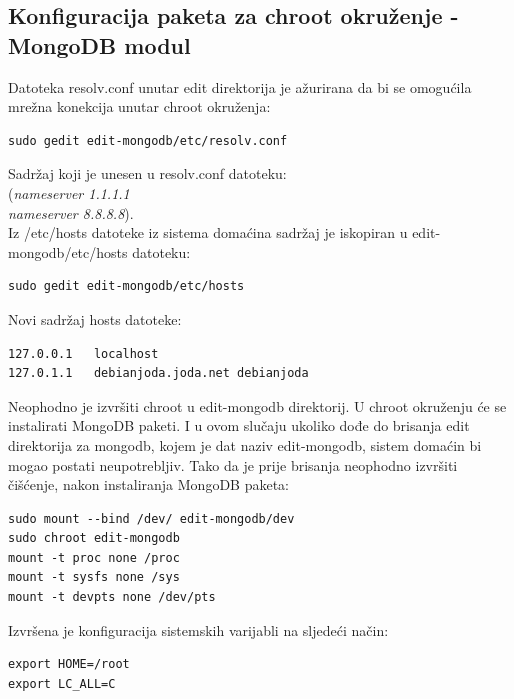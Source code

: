 \documentclass[12pt,vi]{mitthesis}
\begin{document}
\subsection*{Konfiguracija paketa za chroot okruženje - MongoDB modul}
\noindent
Datoteka resolv.conf unutar edit direktorija je ažurirana da bi se omogućila mrežna konekcija unutar chroot okruženja:
\begin{lstlisting}[style=BashInputStyle]
sudo gedit edit-mongodb/etc/resolv.conf
\end{lstlisting}
Sadržaj koji je unesen u resolv.conf datoteku:\\
(\textit{nameserver 1.1.1.1 \\
nameserver 8.8.8.8}).\\
\noindent
Iz /etc/hosts datoteke iz sistema domaćina sadržaj je iskopiran u edit-mongodb/etc/hosts datoteku:
\begin{lstlisting}[style=BashInputStyle]
sudo gedit edit-mongodb/etc/hosts
\end{lstlisting}
Novi sadržaj hosts datoteke:
\begin{lstlisting}
127.0.0.1	localhost
127.0.1.1	debianjoda.joda.net	debianjoda
\end{lstlisting}
\noindent
Neophodno je izvršiti chroot u edit-mongodb direktorij. U chroot okruženju će se instalirati MongoDB paketi. I u ovom slučaju ukoliko dođe do brisanja edit direktorija za mongodb, kojem je dat naziv edit-mongodb, sistem domaćin bi mogao postati neupotrebljiv. Tako da je prije brisanja neophodno izvršiti čišćenje, nakon instaliranja MongoDB paketa:
\begin{lstlisting}[style=BashInputStyle]
sudo mount --bind /dev/ edit-mongodb/dev
sudo chroot edit-mongodb
mount -t proc none /proc
mount -t sysfs none /sys
mount -t devpts none /dev/pts
\end{lstlisting}

\noindent
Izvršena je konfiguracija sistemskih varijabli na sljedeći način:
\begin{lstlisting}[style=BashInputStyle]
export HOME=/root
export LC_ALL=C
\end{lstlisting}
\end{document}
